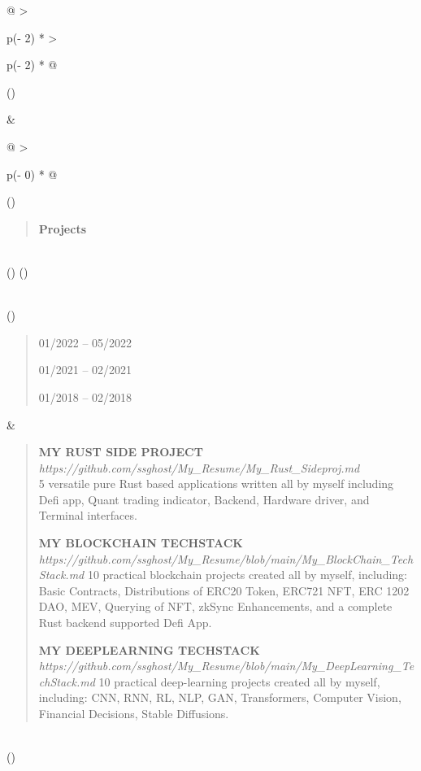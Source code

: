 \documentclass[
]{article}
\begin{document}
\begin{longtable}[]{@{}
  >{\raggedright\arraybackslash}p{(\columnwidth - 2\tabcolsep) * }
  >{\raggedright\arraybackslash}p{(\columnwidth - 2\tabcolsep) * }@{}}
\toprule()
\begin{minipage}[b]{\linewidth}\raggedright
\end{minipage} & \begin{minipage}[b]{\linewidth}\raggedright
\begin{longtable}[]{@{}
  >{\raggedright\arraybackslash}p{(\columnwidth - 0\tabcolsep) * }@{}}
\toprule()
\begin{minipage}[b]{\linewidth}\raggedright
\begin{quote}
\textbf{Projects}
\end{quote}
\end{minipage} \\
\midrule()
\endhead
\bottomrule()
\end{longtable}
\end{minipage} \\
\midrule()
\endhead
\begin{minipage}[t]{\linewidth}\raggedright
\begin{quote}
01/2022 -- 05/2022

01/2021 -- 02/2021

01/2018 -- 02/2018
\end{quote}
\end{minipage} & \begin{minipage}[t]{\linewidth}\raggedright
\begin{quote}
\textbf{MY RUST SIDE PROJECT}\\
\emph{https://github.com/ssghost/My\_Resume/My\_Rust\_Sideproj.md}\\
5 versatile pure Rust based applications written all by myself including
Defi app, Quant trading indicator, Backend, Hardware driver, and
Terminal interfaces.

\textbf{MY BLOCKCHAIN TECHSTACK}\\
\emph{https://github.com/ssghost/My\_Resume/blob/main/My\_BlockChain\_TechStack.md}
10 practical blockchain projects created all by myself, including: Basic
Contracts, Distributions of ERC20 Token, ERC721 NFT, ERC 1202 DAO, MEV,
Querying of NFT, zkSync Enhancements, and a complete Rust backend
supported Defi App.

\textbf{MY DEEPLEARNING TECHSTACK}\\
\emph{https://github.com/ssghost/My\_Resume/blob/main/My\_DeepLearning\_TechStack.md}
10 practical deep-learning projects created all by myself, including:
CNN, RNN, RL, NLP, GAN, Transformers, Computer Vision, Financial
Decisions, Stable Diffusions.
\end{quote}\strut
\end{minipage} \\
\bottomrule()
\end{longtable}
\end{document}
